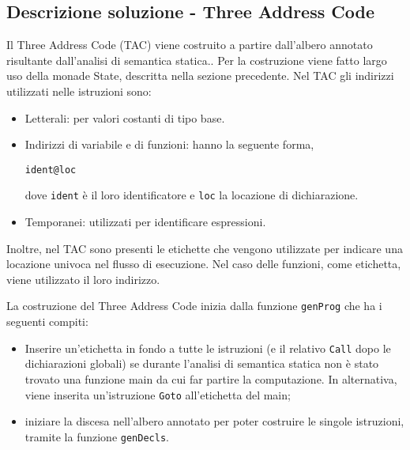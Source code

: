 \subsection{Descrizione soluzione - Three Address Code}

Il Three Address Code (TAC) viene costruito a partire dall'albero annotato risultante dall'analisi di semantica statica.. Per la costruzione viene fatto largo uso della monade State, descritta nella sezione precedente.
Nel TAC gli indirizzi utilizzati nelle istruzioni sono:
\begin{itemize}
    \item Letterali: per valori costanti di tipo base.
    \item Indirizzi di variabile e di funzioni: hanno la seguente forma,
    \begin{center}
        {\tt ident@loc}
    \end{center}
    dove {\tt ident} è il loro identificatore e {\tt loc} la locazione di dichiarazione.
    \item Temporanei: utilizzati per identificare espressioni.
\end{itemize}
Inoltre, nel TAC sono presenti le etichette che vengono utilizzate per indicare una locazione univoca nel flusso di esecuzione. Nel caso delle funzioni, come etichetta, viene utilizzato il loro indirizzo.

La costruzione del Three Address Code inizia dalla funzione {\tt genProg} che ha i seguenti compiti:
\begin{itemize}
    \item Inserire un'etichetta in fondo a tutte le istruzioni (e il relativo {\tt Call} dopo le dichiarazioni globali) se durante l'analisi di semantica statica non è stato trovato una funzione main da cui far partire la computazione. In alternativa, viene inserita un'istruzione {\tt Goto} all'etichetta del main;
    \item iniziare la discesa nell'albero annotato per poter costruire le singole istruzioni, tramite la funzione {\tt genDecls}.
\end{itemize}

